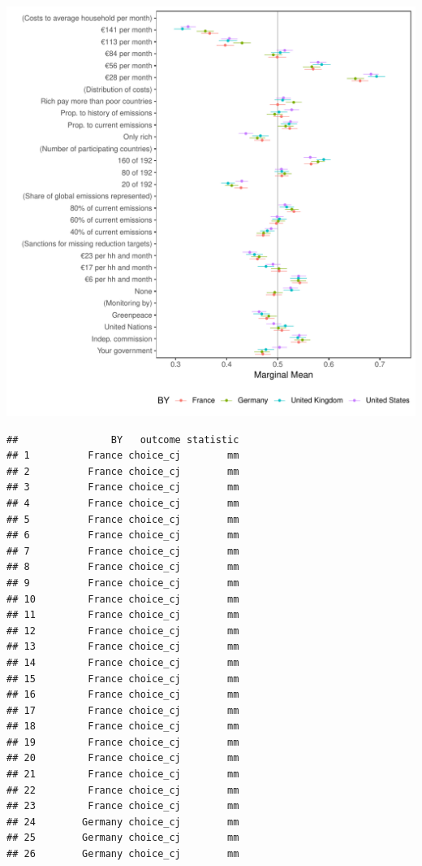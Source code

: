 \documentclass[a4paper,12pt]{article}\usepackage[]{graphicx}\usepackage[]{color}
\makeatletter
\def\maxwidth{ %
  \ifdim\Gin@nat@width>\linewidth
    \linewidth
  \else
    \Gin@nat@width
  \fi
}
\newenvironment{kframe}{%
 \def\at@end@of@kframe{}%
 \ifinner\ifhmode%
  \def\at@end@of@kframe{\end{minipage}}%
  \begin{minipage}{\columnwidth}%
 \fi\fi%
 \def\FrameCommand##1{\hskip\@totalleftmargin \hskip-\fboxsep
 \colorbox{shadecolor}{##1}\hskip-\fboxsep
     \hskip-\linewidth \hskip-\@totalleftmargin \hskip\columnwidth}%
 \MakeFramed {\advance\hsize-\width
   \@totalleftmargin\z@ \linewidth\hsize
   \@setminipage}}%
 {\par\unskip\endMakeFramed%
 \at@end@of@kframe}
\newenvironment{knitrout}{}{} %
\makeatother
\begin{document}
\begin{knitrout}
\color{fgcolor}
\includegraphics[width=\maxwidth]{figure/bechtel_subgroup_mm-1} 
\begin{kframe}\begin{verbatim}
##                BY   outcome statistic
## 1          France choice_cj        mm
## 2          France choice_cj        mm
## 3          France choice_cj        mm
## 4          France choice_cj        mm
## 5          France choice_cj        mm
## 6          France choice_cj        mm
## 7          France choice_cj        mm
## 8          France choice_cj        mm
## 9          France choice_cj        mm
## 10         France choice_cj        mm
## 11         France choice_cj        mm
## 12         France choice_cj        mm
## 13         France choice_cj        mm
## 14         France choice_cj        mm
## 15         France choice_cj        mm
## 16         France choice_cj        mm
## 17         France choice_cj        mm
## 18         France choice_cj        mm
## 19         France choice_cj        mm
## 20         France choice_cj        mm
## 21         France choice_cj        mm
## 22         France choice_cj        mm
## 23         France choice_cj        mm
## 24        Germany choice_cj        mm
## 25        Germany choice_cj        mm
## 26        Germany choice_cj        mm

\end{verbatim}
\end{kframe}
\end{knitrout}
\end{document}
